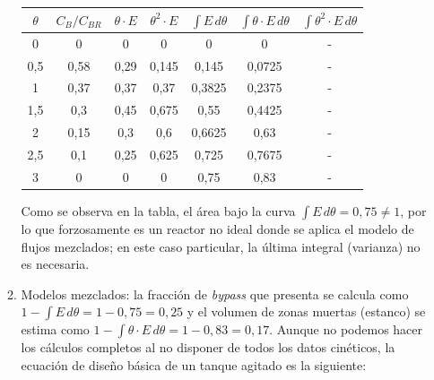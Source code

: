 \begin{enumerate}
\begin{enumerate}[label={\alph*)}]
		            \begin{center}
			            \begin{tabular}{|c|c|c|c|c|c|c|}
				            \hline
				            $\theta$ & $C_B/C_{BR}$ & $\theta \cdot E$ & $\theta^2 \cdot E$ & $\int E \, d\theta$ & $\int \theta \cdot E \, d\theta$ & $\int \theta^2 \cdot E \, d\theta$ \\ \hline
				            0        & 0            & 0                & 0                  & 0                   & 0                                & -                                  \\ \hline
				            0,5      & 0,58         & 0,29             & 0,145              & 0,145               & 0,0725                           & -                                  \\ \hline
				            1        & 0,37         & 0,37             & 0,37               & 0,3825              & 0,2375                           & -                                  \\ \hline
				            1,5      & 0,3          & 0,45             & 0,675              & 0,55                & 0,4425                           & -                                  \\ \hline
				            2        & 0,15         & 0,3              & 0,6                & 0,6625              & 0,63                             & -                                  \\ \hline
				            2,5      & 0,1          & 0,25             & 0,625              & 0,725               & 0,7675                           & -                                  \\ \hline
				            3        & 0            & 0                & 0                  & 0,75                & 0,83                             & -                                  \\ \hline
			            \end{tabular}
		            \end{center}
		            Como se observa en la tabla, el área bajo la curva $\int E \, d\theta = 0,75 \neq 1$, por lo que forzosamente es un reactor no ideal donde se aplica el modelo de flujos mezclados; en este caso particular, la última integral (varianza) no es necesaria.
		      \item Modelos mezclados: la fracción de \textit{bypass} que presenta se calcula como $1-\int E \, d\theta = 1-0,75=0,25$ y el volumen de zonas muertas (estanco) se estima como $1-\int \theta \cdot E \, d\theta = 1-0,83=0,17$. Aunque no podemos hacer los cálculos completos al no disponer de todos los datos cinéticos, la ecuación de diseño básica de un tanque agitado es la siguiente:

\end{enumerate}
\end{enumerate}
